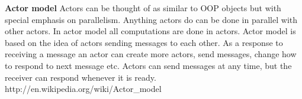 \textbf{Actor model} Actors can be thought of as similar to OOP objects but with special emphasis on parallelism. Anything actors do can be done in parallel with other actors. In actor model all computations are done in actors. Actor model is based on the idea of actors sending messages to each other. As a response to receiving a message an actor can create more actors, send messages, change how to respond to next message etc. Actors can send messages at any time, but the receiver can respond whenever it is ready.\\http://en.wikipedia.org/wiki/Actor\_model